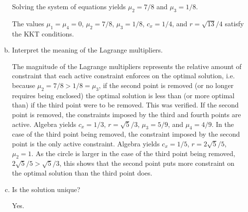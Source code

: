 \documentclass{article}
\begin{document}
\begin{enumerate}[a)]
Solving the system of equations yields $\mu_2 = 7/8$ and $\mu_3 = 1/8$.

The values $\mu_1 = \mu_4 = 0$, $\mu_2 = 7/8$, $\mu_3 = 1/8$, $c_x = 1/4$, and $r = \sqrt{13}/4$ satisfy the KKT conditions.



\item Interpret the meaning of the Lagrange multipliers.

The magnitude of the Lagrange multipliers represents the relative amount of constraint that each active constraint enforces on the optimal solution, i.e. because $\mu_2 = 7/8 > 1/8 = \mu_3$, if the second point is removed (or no longer requires being enclosed) the optimal solution is less than (or more optimal than) if the third point were to be removed.
This was verified.
If the second point is removed, the constraints imposed by the third and fourth points are active.
Algebra yields $c_x = 1/3$, $r = \sqrt{5}/3$, $\mu_3 = 5/9$, and $\mu_4 = 4/9$.
In the case of the third point being removed, the constraint imposed by the second point is the only active constraint.
Algebra yields $c_x = 1/5$, $r = 2\sqrt{5}/5$, $\mu_2 = 1$.
As the circle is larger in the case of the third point being removed, $2\sqrt{5}/5 > \sqrt{5}/3$, this shows that the second point puts more constraint on the optimal solution than the third point does.

\item Is the solution unique?

Yes.

\end{enumerate}
\end{document}
